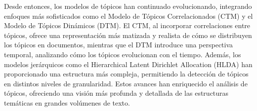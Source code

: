 Desde entonces, los modelos de tópicos han continuado evolucionando, integrando enfoques más sofisticados como el Modelo de Tópicos Correlacionados (CTM) y el Modelo de Tópicos Dinámicos (DTM). El CTM, al incorporar correlaciones entre tópicos, ofrece una representación más matizada y realista de cómo se distribuyen los tópicos en documentos, mientras que el DTM introduce una perspectiva temporal, analizando cómo los tópicos evolucionan con el tiempo. Además, los modelos jerárquicos como el Hierarchical Latent Dirichlet Allocation (HLDA) han proporcionado una estructura más compleja, permitiendo la detección de tópicos en distintos niveles de granularidad. Estos avances han enriquecido el análisis de tópicos, ofreciendo una visión más profunda y detallada de las estructuras temáticas en grandes volúmenes de texto.




